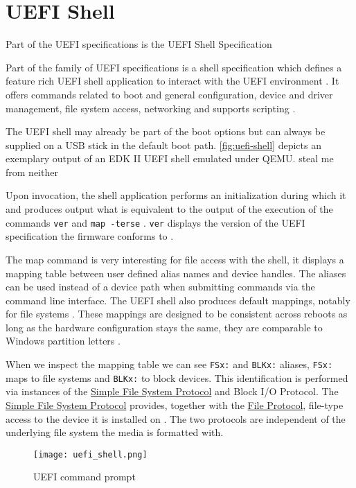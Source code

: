 
\section{\acs{UEFI} Shell}

Part of the \ac{UEFI} specifications is the \ac{UEFI} Shell Specification

Part of the family of \ac{UEFI} specifications is a shell specification which defines a feature rich \ac{UEFI} shell application to interact with the \ac{UEFI} environment \cite[Section 1.1]{uefi-shell-spec}.
It offers commands related to boot and general configuration, device and driver management, file system access, networking \cite[Section 5.1]{uefi-shell-spec} and supports scripting \cite[Section 4]{uefi-shell-spec}.

The \ac{UEFI} shell may already be part of the boot options but can always be supplied on a \ac{USB} stick in the default boot path.
\autoref{fig:uefi-shell} depicts an exemplary output of an \ac{EDK} II \ac{UEFI} shell emulated under QEMU.
steal me from neither


Upon invocation, the shell application performs an initialization during which it  and produces output what is equivalent to the output of the execution of the commands \lstinline{ver} and \lstinline{map -terse} \cite[Section 3.3]{uefi-shell-spec}.
\lstinline{ver} displays the version of the \ac{UEFI} specification the firmware conforms to \cite[Section 5.3]{uefi-shell-spec}.


The map command is very interesting for file access with the shell, it displays a mapping table between user defined alias names and device handles.
The aliases can be used instead of a device path when submitting commands via the command line interface.
The \ac{UEFI} shell also produces default mappings, notably for file systems \cite[Section 3.7.2]{uefi-shell-spec}.
These mappings are designed to be consistent across reboots as long as the hardware configuration stays the same, they are comparable to Windows partition letters \cite[Appendix A]{uefi-shell-spec}.

When we inspect the mapping table we can see \lstinline{FSx:} and \lstinline{BLKx:} aliases, \lstinline{FSx:} maps to file systems and \lstinline{BLKx:} to block devices.
This identification is performed via instances of the \hyperref[lst:simple-file-system-protocol]{Simple File System Protocol} and  Block \ac{I/O} Protocol.
The \hyperref[lst:simple-file-system-protocol]{Simple File System Protocol} \cite[Section 13.4]{uefi-spec} provides, together with the \hyperref[lst:simple-file-system-protocol]{File Protocol}, file-type access to the device it is installed on \cite[Section 13.5]{uefi-spec}.
The two protocols are independent of the underlying file system the media is formatted with.




\begin{figure}[htb]
    \centering
    \texttt{[image: uefi\_shell.png]}
    \caption{\ac{UEFI} command prompt}
    \label{fig:uefi-shell}
\end{figure}
